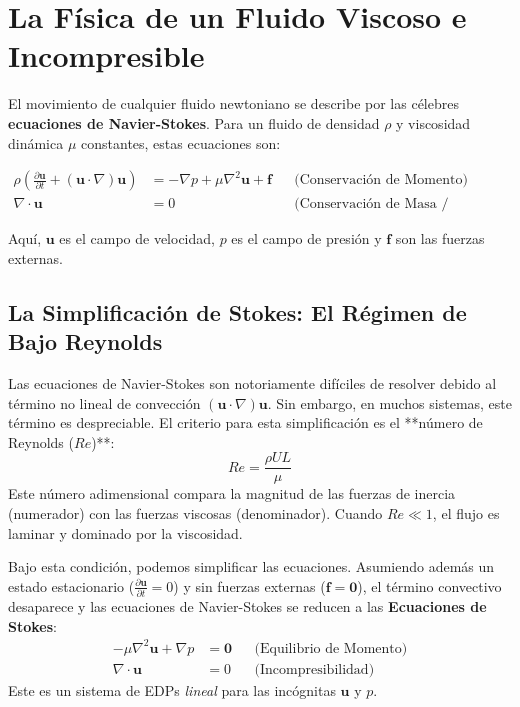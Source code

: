 \section{La Física de un Fluido Viscoso e Incompresible}
El movimiento de cualquier fluido newtoniano se describe por las célebres \textbf{ecuaciones de Navier-Stokes}. Para un fluido de densidad $\rho$ y viscosidad dinámica $\mu$ constantes, estas ecuaciones son:

\begin{align}
    \rho \left( \frac{\partial \mathbf{u}}{\partial t} + (\mathbf{u} \cdot \nabla) \mathbf{u} \right) &= -\nabla p + \mu \nabla^2 \mathbf{u} + \mathbf{f} && \text{(Conservación de Momento)} \\
    \nabla \cdot \mathbf{u} &= 0 && \text{(Conservación de Masa / Incompresibilidad)}
\end{align}

Aquí, $\mathbf{u}$ es el campo de velocidad, $p$ es el campo de presión y $\mathbf{f}$ son las fuerzas externas.

\subsection{La Simplificación de Stokes: El Régimen de Bajo Reynolds}
Las ecuaciones de Navier-Stokes son notoriamente difíciles de resolver debido al término no lineal de convección $(\mathbf{u} \cdot \nabla) \mathbf{u}$. Sin embargo, en muchos sistemas, este término es despreciable. El criterio para esta simplificación es el **número de Reynolds ($Re$)**:
$$ Re = \frac{\rho U L}{\mu} $$
Este número adimensional compara la magnitud de las fuerzas de inercia (numerador) con las fuerzas viscosas (denominador). Cuando $Re \ll 1$, el flujo es laminar y dominado por la viscosidad.

Bajo esta condición, podemos simplificar las ecuaciones. Asumiendo además un estado estacionario ($\frac{\partial \mathbf{u}}{\partial t} = 0$) y sin fuerzas externas ($\mathbf{f}=\mathbf{0}$), el término convectivo desaparece y las ecuaciones de Navier-Stokes se reducen a las \textbf{Ecuaciones de Stokes}:
\begin{align}
    -\mu \nabla^2 \mathbf{u} + \nabla p &= \mathbf{0} && \text{(Equilibrio de Momento)} \label{eq:stokes_mom} \\
    \nabla \cdot \mathbf{u} &= 0 && \text{(Incompresibilidad)} \label{eq:stokes_inc}
\end{align}
Este es un sistema de EDPs \textit{lineal} para las incógnitas $\mathbf{u}$ y $p$.

